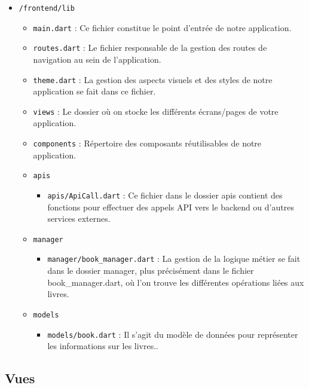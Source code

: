\begin{itemize}
\tightlist
\item
  \texttt{/frontend/lib}

  \begin{itemize}
  \tightlist
  \item
    \texttt{main.dart} : Ce fichier constitue le point d'entrée de notre
    application.
  \item
    \texttt{routes.dart} : Le fichier responsable de la gestion des
    routes de navigation au sein de l'application.
  \item
    \texttt{theme.dart} : La gestion des aspects visuels et des styles
    de notre application se fait dans ce fichier.
  \item
    \texttt{views} : Le dossier où on stocke les différents écrans/pages
    de votre application.
  \item
    \texttt{components} : Répertoire des composants réutilisables de
    notre application.
  \item
    \texttt{apis}

    \begin{itemize}
    \tightlist
    \item
      \texttt{apis/ApiCall.dart} : Ce fichier dans le dossier apis
      contient des fonctions pour effectuer des appels API vers le
      backend ou d'autres services externes.
    \end{itemize}
  \item
    \texttt{manager}

    \begin{itemize}
    \tightlist
    \item
      \texttt{manager/book\_manager.dart} : La gestion de la logique
      métier se fait dans le dossier manager, plus précisément dans le
      fichier book\_manager.dart, où l'on trouve les différentes
      opérations liées aux livres.
    \end{itemize}
  \item
    \texttt{models}

    \begin{itemize}
    \tightlist
    \item
      \texttt{models/book.dart} : Il s'agit du modèle de données pour
      représenter les informations sur les livres..
    \end{itemize}
  \end{itemize}
\end{itemize}

\subsection{Vues}\label{vues}

